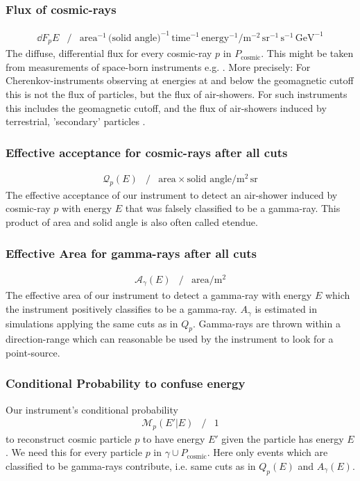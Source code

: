 \documentclass{article}%
\begin{document}
\subsubsection*{Flux of cosmic-rays}
%
\begin{eqnarray*}
\dd{F_p}{E} &/&
\text{area}^{-1}\,\text{(solid angle)}^{-1}\,\text{time}^{-1}\,\text{energy}^{-1} /
\text{m}^{-2}\,\text{sr}^{-1}\,\text{s}^{-1}\,\text{GeV}^{-1}
\end{eqnarray*}
The diffuse, differential flux for every cosmic-ray $p$ in $P_\text{cosmic}$. This might be taken from measurements of space-born instruments e.g. \cite{aguilar2014precision,aguilar2015precision}.
%
More precisely: For Cherenkov-instruments observing at energies at and below the geomagnetic cutoff this is not the flux of particles, but the flux of air-showers.
%
For such instruments this includes the geomagnetic cutoff, and the flux of air-showers induced by terrestrial, 'secondary' particles \cite{lipari2002fluxes}.
%
\subsubsection*{Effective acceptance for cosmic-rays after all cuts}
\begin{eqnarray*}
\mathcal{Q}_p(E) &/&
\text{area} \times{} \text{solid angle} /
\text{m}^{2}\,\text{sr}
\end{eqnarray*}
%
The effective acceptance of our instrument to detect an air-shower induced by cosmic-ray $p$ with energy $E$ that was falsely classified to be a gamma-ray.
%
This product of area and solid angle is also often called etendue.
%
\subsubsection*{Effective Area for gamma-rays after all cuts}
\begin{eqnarray*}
\mathcal{A}_\gamma(E) &/&
\text{area} /
\text{m}^{2}
\end{eqnarray*}
%
The effective area of our instrument to detect a gamma-ray with energy $E$ which the instrument positively classifies to be a gamma-ray.
%
$A_\gamma$ is estimated in simulations applying the same cuts as in $Q_p$.
%
Gamma-rays are thrown within a direction-range which can reasonable be used by the instrument to look for a point-source.
%
\subsubsection*{Conditional Probability to confuse energy}
%
Our instrument's conditional probability
%
\begin{eqnarray*}
\mathcal{M}_p(E' \vert E) &/& 1
\end{eqnarray*}
%
to reconstruct cosmic particle $p$ to have energy $E'$ given the particle has energy $E$.
%
We need this for every particle $p$ in $\gamma \cup P_\text{cosmic}$.
%
Here only events which are classified to be gamma-rays contribute, i.e. same cuts as in $Q_p(E)$ and $A_\gamma(E)$.
%
\end{document}
